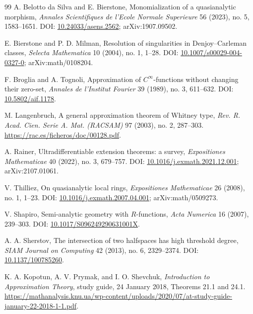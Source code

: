 \documentclass[11pt]{article}
\theoremstyle{definition}
\theoremstyle{remark}
\begin{document}
\begin{thebibliography}{99}
A. Belotto da Silva and E. Bierstone,
\newblock Monomialization of a quasianalytic morphism,
\newblock \emph{Annales Scientifiques de l'Ecole Normale Superieure} 56 (2023), no. 5, 1583--1651.
\newblock DOI: \href{https://doi.org/10.24033/asens.2562}{10.24033/asens.2562}; arXiv:1907.09502.

E. Bierstone and P. D. Milman,
\newblock Resolution of singularities in Denjoy--Carleman classes,
\newblock \emph{Selecta Mathematica} 10 (2004), no. 1, 1--28.
\newblock DOI: \href{https://doi.org/10.1007/s00029-004-0327-0}{10.1007/s00029-004-0327-0}; arXiv:math/0108204.


F. Broglia and A. Tognoli,
\newblock Approximation of $C^\infty$-functions without changing their zero-set,
\newblock \emph{Annales de l'Institut Fourier} 39 (1989), no. 3, 611--632.
\newblock DOI: \href{https://doi.org/10.5802/aif.1178}{10.5802/aif.1178}.

M. Langenbruch,
\newblock A general approximation theorem of Whitney type,
\newblock \emph{Rev. R. Acad. Cien. Serie A. Mat. (RACSAM)} 97 (2003), no. 2, 287--303.
\newblock \url{https://rac.es/ficheros/doc/00128.pdf}.

A. Rainer,
\newblock Ultradifferentiable extension theorems: a survey,
\newblock \emph{Expositiones Mathematicae} 40 (2022), no. 3, 679--757.
\newblock DOI: \href{https://doi.org/10.1016/j.exmath.2021.12.001}{10.1016/j.exmath.2021.12.001}; arXiv:2107.01061.

V. Thilliez,
\newblock On quasianalytic local rings,
\newblock \emph{Expositiones Mathematicae} 26 (2008), no. 1, 1--23.
\newblock DOI: \href{https://doi.org/10.1016/j.exmath.2007.04.001}{10.1016/j.exmath.2007.04.001}; arXiv:math/0509273.

V. Shapiro,
\newblock Semi-analytic geometry with $R$-functions,
\newblock \emph{Acta Numerica} 16 (2007), 239--303.
\newblock DOI: \href{https://doi.org/10.1017/S096249290631001X}{10.1017/S096249290631001X}.

A. A. Sherstov,
\newblock The intersection of two halfspaces has high threshold degree,
\newblock \emph{SIAM Journal on Computing} 42 (2013), no. 6, 2329--2374.
\newblock DOI: \href{https://doi.org/10.1137/100785260}{10.1137/100785260}.

K. A. Kopotun, A. V. Prymak, and I. O. Shevchuk,
\newblock \emph{Introduction to Approximation Theory}, study guide, 24 January 2018,
\newblock Theorems 21.1 and 24.1.
\newblock \url{https://mathanalysis.knu.ua/wp-content/uploads/2020/07/at-study-guide-january-22-2018-1-1.pdf}.

\end{thebibliography}
\end{document}
